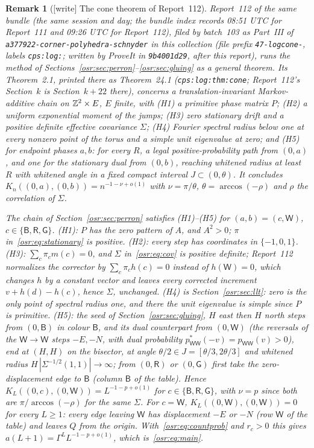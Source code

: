 \documentclass[11pt,letterpaper]{article}
\newtheorem{remark}[theorem]{Remark}
\newcommand{\G}{\Gamma}\newcommand{\s}{\sqrt{17}}
\newcommand{\B}{\mathsf B}\newcommand{\RR}{\mathsf R}\newcommand{\GG}{\mathsf G}\newcommand{\W}{\mathsf W}
\numberwithin{equation}{section}
\begin{document}
\begin{remark}[{[write]} The cone theorem of Report~112]\label{osr:rem:cone}\upshape
Report~112 of the same bundle (the same session and day; the bundle index
records 08:51 UTC for Report~111 and 09:26 UTC for Report~112), filed by
batch~103 as Part~III of \nolinkurl{a377922-corner-polyhedra-schnyder} in
this collection (file prefix \nolinkurl{47-logcone-}, labels
\nolinkurl{cps:log:}; written by ProveIt in \nolinkurl{9b4001d29}, after this
report), runs the method of
Sections~\ref{osr:sec:perron}--\ref{osr:sec:gluing} as a general theorem. Its
Theorem~2.1, printed there as Theorem~24.1 (\nolinkurl{cps:log:thm:cone};
Report~112's Section~$k$ is Section~$k+22$ there), concerns a
translation-invariant
Markov-additive chain on $\mathbb Z^2\times E$, $E$ finite, with
\textup{(H1)} a primitive phase matrix $P$; \textup{(H2)} a uniform
exponential moment of the jumps; \textup{(H3)} zero stationary drift and a
positive definite effective covariance $\Sigma$; \textup{(H4)} Fourier
spectral radius below one at every nonzero point of the torus and a simple
unit eigenvalue at zero; and \textup{(H5)} for endpoint phases $a,b$: for
every $R$, a legal positive-probability path from $(0,a)$, and one for the
stationary dual from $(0,b)$, reaching whitened radius at least $R$ with
whitened angle in a fixed compact interval $J\subset(0,\theta)$. It
concludes $K_n((0,a),(0,b))=n^{-1-\nu+o(1)}$ with $\nu=\pi/\theta$,
$\theta=\arccos(-\rho)$ and $\rho$ the correlation of $\Sigma$.

\emph{The chain of Section~\ref{osr:sec:perron} satisfies
\textup{(H1)--(H5)} for $(a,b)=(c,\W)$, $c\in\{\B,\RR,\GG\}$.}
(H1): $P$ has the zero pattern of $A$, and $A^2>0$; $\pi$
in~\eqref{osr:eq:stationary} is positive. (H2): every step has coordinates
in $\{-1,0,1\}$. (H3): $\sum_c\pi_cm(c)=0$, and $\Sigma$
in~\eqref{osr:eq:cov} is positive definite; Report~112 normalizes the
corrector by $\sum_c\pi_ch(c)=0$ instead of $h(\W)=0$, which changes $h$ by
a constant vector and leaves every corrected increment $v+h(d)-h(c)$, hence
$\Sigma$, unchanged. (H4) is Section~\ref{osr:sec:llt}: zero is the only
point of spectral radius one, and there the unit eigenvalue is simple since
$P$ is primitive. (H5): the seed of Section~\ref{osr:sec:gluing}, $H$ east
then $H$ north steps from $(0,\B)$ in colour $\B$, and its dual counterpart
from $(0,\W)$ (the reversals of the $\W\to\W$ steps $-E,-N$, with dual
probability $p^*_{\W\W}(-v)=p_{\W\W}(v)>0$), end at $(H,H)$ on the
bisector, at angle $\theta/2\in J=[\theta/3,2\theta/3]$ and whitened radius
$H\,|\Sigma^{-1/2}(1,1)|\to\infty$; from $(0,\RR)$ or $(0,\GG)$ first take
the zero-displacement edge to $\B$ (column $\B$ of the table). Hence
$K_L((0,c),(0,\W))=L^{-1-p+o(1)}$ for $c\in\{\B,\RR,\GG\}$, with $\nu=p$
since both are $\pi/\arccos(-\rho)$ for the same $\Sigma$. For $c=\W$,
$K_L((0,\W),(0,\W))=0$ for every $L\ge1$: every edge leaving $\W$ has
displacement $-E$ or $-N$ (row $\W$ of the table) and leaves $Q$ from the
origin. With~\eqref{osr:eq:countprob} and $r_c>0$ this gives
$a(L+1)=\G^LL^{-1-p+o(1)}$, which is~\eqref{osr:eq:main}.


\end{remark}
\end{document}
